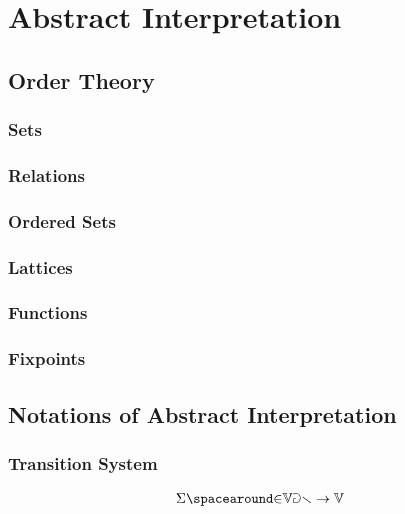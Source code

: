 
\chapter{Abstract Interpretation}

\section{Order Theory}

\subsection{Sets}

\subsection{Relations}

\subsection{Ordered Sets}

\subsection{Lattices}

\subsection{Functions}

\subsection{Fixpoints}

\section{Notations of Abstract Interpretation}

\subsection{Transition System}

\begin{definition}[State]
  \begin{align*}
    \state \IN \variables \to \values
  \end{align*}
\end{definition}

